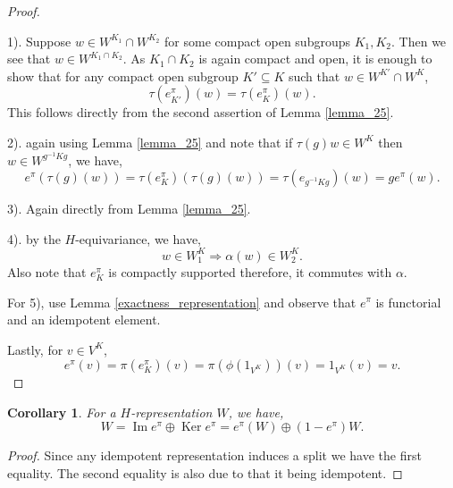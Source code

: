 \documentclass[8pt]{article}
\newtheorem{corollary}{Corollary} [section]
\DeclareMathOperator{\Image}{Im}
\DeclareMathOperator{\Ker}{Ker}
\begin{document}
\begin{proof}$\:$\\
  \par 1). Suppose $w\in W^{K_1}\cap W^{K_2}$ for some compact open subgroups $K_1,K_2$. Then we see that $w\in W^{K_1\cap K_2}$. As $K_1\cap K_2$ is again compact and open, 
  it is enough to show that for any compact open subgroup $K'\subseteq K$ such that $w\in W^{K'}\cap W^{K}$, 
  \begin{equation*}
    \tau(e_{K'}^\pi)(w) = \tau(e_{K}^\pi)(w).
  \end{equation*}
  This follows directly from the second assertion of Lemma \ref{lemma_25}.
  \par 2). again using Lemma \ref{lemma_25} and note that if $\tau(g)w\in W^K$ then $w\in W^{g^{-1}Kg}$, we have,
  \begin{equation*}
    e^\pi(\tau(g)(w)) = \tau(e_K^\pi)(\tau(g)(w)) = \tau(e_{g^{-1}Kg})(w) = ge^\pi(w).
  \end{equation*}
  \par 3). Again directly from Lemma \ref{lemma_25}.
  \par 4). by the $H$-equivariance, we have,
  \begin{equation*}
    w\in W_1^K\Rightarrow \alpha(w)\in W_2^K.
  \end{equation*}
  Also note that $e_K^\pi$ is compactly supported therefore, it commutes with $\alpha$.
  \par For 5), use Lemma \ref{exactness_representation} and observe that $e^\pi$ is functorial and an idempotent element.
  \par Lastly, for $v\in V^K$, 
  \begin{equation*}
    e^\pi(v) = \pi(e_K^\pi)(v) = \pi(\phi(1_{V^K}))(v) = 1_{V^K}(v) = v.
  \end{equation*}
\end{proof}

\begin{corollary}
  For a $H$-representation $W$, we have,
  \begin{equation*}
    W = \Image e^\pi\oplus \Ker e^\pi = e^\pi(W)\oplus(1-e^\pi)W.
  \end{equation*}
\end{corollary}

\begin{proof}
  Since any idempotent representation induces a split we have the first equality. The second equality is also due to that it being idempotent.
\end{proof}
\end{document}
